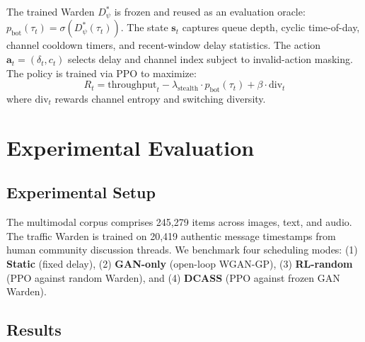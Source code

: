 \documentclass[conference]{IEEEtran}
\begin{document}
The trained Warden $D_{\psi}^*$ is frozen and reused as an evaluation oracle: $p_{\text{bot}}(\tau_t) = \sigma(D_{\psi}^*(\tau_t))$. The state $\mathbf{s}_t$ captures queue depth, cyclic time-of-day, channel cooldown timers, and recent-window delay statistics. The action $\mathbf{a}_t = (\delta_t, c_t)$ selects delay and channel index subject to invalid-action masking. The policy is trained via PPO to maximize:
\begin{equation}
R_t = \text{throughput}_t - \lambda_{\text{stealth}} \cdot p_{\text{bot}}(\tau_t) + \beta \cdot \text{div}_t
\end{equation}
where $\text{div}_t$ rewards channel entropy and switching diversity.

\section{Experimental Evaluation}

\subsection{Experimental Setup}

The multimodal corpus comprises 245,279 items across images, text, and audio. The traffic Warden is trained on 20,419 authentic message timestamps from human community discussion threads. We benchmark four scheduling modes: (1) \textbf{Static} (fixed delay), (2) \textbf{GAN-only} (open-loop WGAN-GP), (3) \textbf{RL-random} (PPO against random Warden), and (4) \textbf{DCASS} (PPO against frozen GAN Warden).

\subsection{Results}

\begin{table}[t]
\caption{Encoding Capacity Comparison Across Coverless Steganography Methods}
\label{tab:t2_capacity}
\centering
{}
\end{table}
\end{document}
